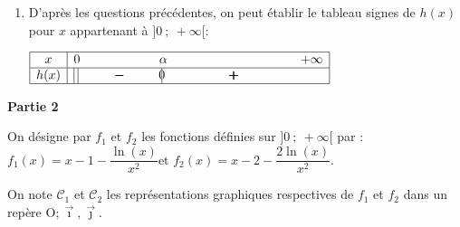 \documentclass[10pt]{article}
\providecommand{\e}{{\mathrm{e}}}
\providecommand{\Oij}{\(\mathrm{O};\vec{\imath},\vec{\jmath}\)}
\begin{document}
\begin{enumerate}
D'après ce tableau de variations, l'équation $h(x)=0$ admet une solution unique  dans l'intervalle $\left  ] 0~;~\e^{\frac{1}{2}}\right [$.

On appelle $\alpha$ cette solution; $h\left (\dfrac{1}{2}\right ) \approx -1,8<0$ et $h(1)=1>0$ donc $\dfrac{1}{2} < \alpha < 1$.

\item D'après les questions précédentes, on peut établir le tableau  signes de $h(x)$ pour $x$ appartenant à $]0~;~ +\infty[$:

\begin{center}
{\renewcommand{\arraystretch}{1.5}
\def\esp{\hspace*{1.5cm}}
\def\hauteur{20pt}
$\begin{array}{|c|l*4{c}|}
\hline
x & 0  & \esp & \alpha & \esp \esp & +\infty \\ 
\hline
h(x) &  \vline\;\vline  &   \pmb{-} & \vline\hspace{-2.7pt}0 & \pmb{+} & \\ 
\hline
\end{array} $
}
\end{center}	

\end{enumerate}

\bigskip

\begin{center}\textbf{Partie 2}\end{center}

On désigne par $f_1$ et $f_2$ les fonctions définies sur $]0~;~ +\infty[$ par :
$f_1(x) = x-1 - \dfrac{\ln (x)}{x^2}\text{et  }f_2(x) = x - 2 - \dfrac{2\ln (x)}{x^2}.$

On note $\mathcal{C}_1$ et $\mathcal{C}_2$ les représentations graphiques respectives de $f_1$ et $f_2$ dans un repère \Oij.

\medskip
\end{document}
